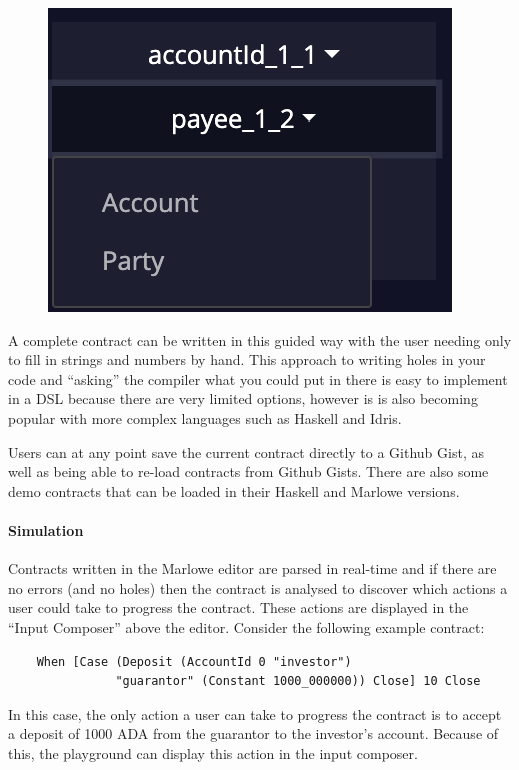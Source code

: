 \documentclass[runningheads]{llncs}
\begin{document}
\begin{figure}
    \vspace*{-0.25in}
    \includegraphics[scale=0.2]{hole_options_2.png}
\end{figure}
A complete contract can be written in this guided way with the user needing only to fill in strings and numbers by hand. This approach to writing holes in your code and ``asking'' the compiler what you could put in there is easy to implement in a DSL because there are very limited options, however is is also becoming popular with more complex languages such as Haskell and Idris.

Users can at any point save the current contract directly to a Github Gist, as well as being able to re-load contracts from Github Gists. There are also some demo contracts that can be loaded in their Haskell and Marlowe versions.

\paragraph{Simulation}

Contracts written in the Marlowe editor are parsed in real-time and if there are no errors (and no holes) then the contract is analysed to discover which actions a user could take to progress the contract. These actions are displayed in the ``Input Composer'' above the editor. Consider the following example contract:
\begin{verbatim}
    When [Case (Deposit (AccountId 0 "investor") 
               "guarantor" (Constant 1000_000000)) Close] 10 Close
\end{verbatim}
In this case, the only action a user can take to progress the contract is to accept a deposit of 1000 ADA
from the guarantor to the investor's account. Because of this, the playground can display this action in the input composer.
\end{document}
